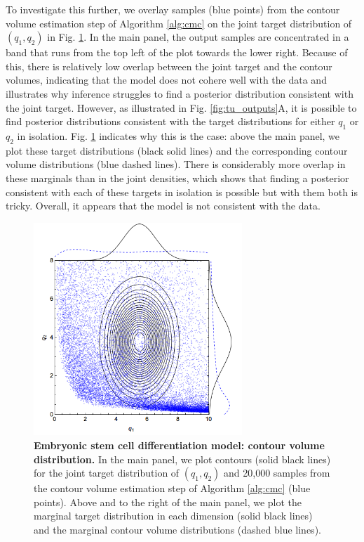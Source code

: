 To investigate this further, we overlay samples (blue points) from the contour volume estimation step of Algorithm \ref{alg:cmc} on the joint target distribution of $(q_1,q_2)$ in Fig. \ref{fig:tu_contours}. In the main panel, the output samples are concentrated in a band that runs from the top left of the plot towards the lower right. Because of this, there is relatively low overlap between the joint target and the contour volumes, indicating that the model does not cohere well with the data and illustrates why inference struggles to find a posterior distribution consistent with the joint target. However, as illustrated in Fig. \ref{fig:tu_outputs}A, it is possible to find posterior distributions consistent with the target distributions for either $q_1$ or $q_2$ in isolation. Fig. \ref{fig:tu_contours} indicates why this is the case: above the main panel, we plot these target distributions (black solid lines) and the corresponding contour volume distributions (blue dashed lines). There is considerably more overlap in these marginals than in the joint densities, which shows that finding a posterior consistent with each of these targets in isolation is possible but with them both is tricky. Overall, it appears that the model is not consistent with the data.

\begin{figure}[H]
	\centerline{\includegraphics[width=0.7\textwidth]{../figures/tu_contours.png}}
	\caption{\textbf{Embryonic stem cell differentiation model: contour volume distribution.} In the main panel, we plot contours (solid black lines) for the joint target distribution of $(q_1,q_2)$ and 20,000 samples from the contour volume estimation step of Algorithm \ref{alg:cmc} (blue points). Above and to the right of the main panel, we plot the marginal target distribution in each dimension (solid black lines) and the marginal contour volume distributions (dashed blue lines).}
	\label{fig:tu_contours}
\end{figure}

